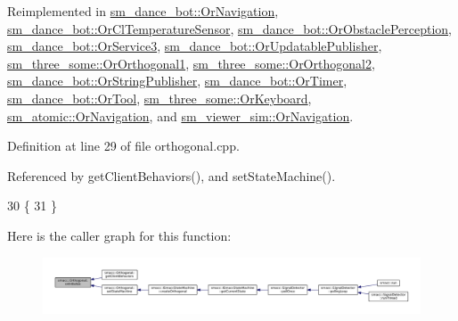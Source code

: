 Reimplemented in \hyperlink{classsm__dance__bot_1_1OrNavigation_a9f87c78f5af67024c9eda25097a135ac}{sm\+\_\+dance\+\_\+bot\+::\+Or\+Navigation}, \hyperlink{classsm__dance__bot_1_1OrClTemperatureSensor_adf83577acca3fd2193d6ca7ba0736484}{sm\+\_\+dance\+\_\+bot\+::\+Or\+Cl\+Temperature\+Sensor}, \hyperlink{classsm__dance__bot_1_1OrObstaclePerception_a4597fbab143e9bc3e350dfa730242a08}{sm\+\_\+dance\+\_\+bot\+::\+Or\+Obstacle\+Perception}, \hyperlink{classsm__dance__bot_1_1OrService3_a394d93c4a340257b8b1b941adeed8cd9}{sm\+\_\+dance\+\_\+bot\+::\+Or\+Service3}, \hyperlink{classsm__dance__bot_1_1OrUpdatablePublisher_a7de06135fd7ddea74ad9bb547fb6e79a}{sm\+\_\+dance\+\_\+bot\+::\+Or\+Updatable\+Publisher}, \hyperlink{classsm__three__some_1_1OrOrthogonal1_ad9dec970afcae7347e3bf2e48e7f8314}{sm\+\_\+three\+\_\+some\+::\+Or\+Orthogonal1}, \hyperlink{classsm__three__some_1_1OrOrthogonal2_a97037952a7372ce6cdb920b1b1c0b72c}{sm\+\_\+three\+\_\+some\+::\+Or\+Orthogonal2}, \hyperlink{classsm__dance__bot_1_1OrStringPublisher_a61cf6dcd0726eb1191dd0a110237968e}{sm\+\_\+dance\+\_\+bot\+::\+Or\+String\+Publisher}, \hyperlink{classsm__dance__bot_1_1OrTimer_aa0091c17ca7ff4c71badd03085272cc4}{sm\+\_\+dance\+\_\+bot\+::\+Or\+Timer}, \hyperlink{classsm__dance__bot_1_1OrTool_a78a07c94234ff0e07450b1e5115fb6a8}{sm\+\_\+dance\+\_\+bot\+::\+Or\+Tool}, \hyperlink{classsm__three__some_1_1OrKeyboard_af49faa7c511ae0232ed0931ce8c85b56}{sm\+\_\+three\+\_\+some\+::\+Or\+Keyboard}, \hyperlink{classsm__atomic_1_1OrNavigation_ac1b6e1922f3d106e3b4429bd50eef474}{sm\+\_\+atomic\+::\+Or\+Navigation}, and \hyperlink{classsm__viewer__sim_1_1OrNavigation_a6f39ecbb3c1ad253c283588df860a8c4}{sm\+\_\+viewer\+\_\+sim\+::\+Or\+Navigation}.



Definition at line 29 of file orthogonal.\+cpp.



Referenced by get\+Client\+Behaviors(), and set\+State\+Machine().


\begin{DoxyCode}
30 \{
31 \}
\end{DoxyCode}


Here is the caller graph for this function\+:
\nopagebreak
\begin{figure}[H]
\begin{center}
\leavevmode
\includegraphics[width=350pt]{classsmacc_1_1Orthogonal_a7a3da420b1554e20aea3ed01067df05c_icgraph}
\end{center}
\end{figure}


